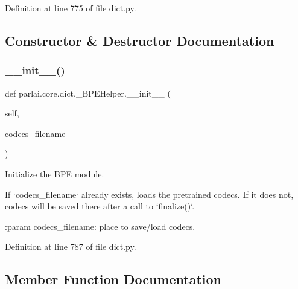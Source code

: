 Definition at line 775 of file dict.\+py.



\subsection{Constructor \& Destructor Documentation}
\mbox{\label{classparlai_1_1core_1_1dict_1_1__BPEHelper_a449da91d98a6bb75bc374782cf9f7016}} 
\subsubsection{\texorpdfstring{\+\_\+\+\_\+init\+\_\+\+\_\+()}{\_\_init\_\_()}}
{\footnotesize\ttfamily def parlai.\+core.\+dict.\+\_\+\+B\+P\+E\+Helper.\+\_\+\+\_\+init\+\_\+\+\_\+ (\begin{DoxyParamCaption}\item[{}]{self,  }\item[{}]{codecs\+\_\+filename }\end{DoxyParamCaption})}

\begin{DoxyVerb}Initialize the BPE module.

If `codecs_filename` already exists, loads the pretrained codecs.
If it does not, codecs will be saved there after a call to `finalize()`.

:param codecs_filename:
    place to save/load codecs.
\end{DoxyVerb}
 

Definition at line 787 of file dict.\+py.



\subsection{Member Function Documentation}
\mbox{\label{classparlai_1_1core_1_1dict_1_1__BPEHelper_a712c4482ea0dc907543effce64bd8145}} 
